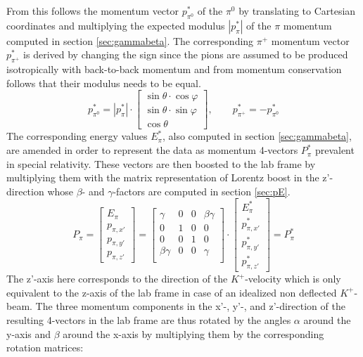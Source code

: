 \documentclass[a4paper,parskip,11pt, DIV12]{scrreprt}
\begin{document}
	From this follows the momentum vector $p^*_{\pi^0}$ of the $\pi^0$ by translating to Cartesian coordinates and multiplying the expected modulus $|p^*_{\pi}|$ of the $\pi$ momentum computed in section \ref{sec:gammabeta}. The corresponding $\pi^+$ momentum vector $p^*_{\pi^+}$ is derived by changing the sign since the pions are assumed to be produced isotropically with back-to-back momentum and from momentum conservation follows that their modulus needs to be equal. 
	\begin{equation}
	p^*_{\pi^0} = |p^*_{\pi}| \cdot \begin{bmatrix}
	\sin\theta \cdot \cos\varphi \\ \sin\theta \cdot \sin\varphi \\ \cos\theta
	\end{bmatrix}
	, \quad \quad p^*_{\pi^+} = -p^*_{\pi^0}
	\end{equation}
	The corresponding energy values $E^*_{\pi}$, also computed in section \ref{sec:gammabeta}, are amended in order to represent the data as momentum 4-vectors $P^*_{\pi}$  prevalent in special relativity. These vectors are then boosted to the lab frame by multiplying them with the matrix representation of Lorentz boost in the z'-direction whose $\beta$- and $\gamma$-factors are computed in section \ref{sec:pE}.
	\begin{equation}
	P_{\pi} = 
	\begin{bmatrix}
	E_{\pi} \\ p_{\pi,x'} \\ p_{\pi,y'} \\ p_{\pi,z'}
	\end{bmatrix}
	=
	\begin{bmatrix}
	\gamma & 0 & 0 & \beta \gamma \\
	0 & 1 & 0 & 0 \\
	0 & 0 & 1 & 0\\
	\beta \gamma & 0 & 0 & \gamma \\
	\end{bmatrix}
	\cdot
	\begin{bmatrix}
	E_{\pi}^* \\ p_{\pi,x'}^* \\ p_{\pi,y'}^* \\ p_{\pi,z'}^*
	\end{bmatrix} = P^*_{\pi}
	\end{equation}
	The z'-axis here corresponds to the direction of the $K^+$-velocity which is only equivalent to the z-axis of the lab frame in case of an idealized non deflected $K^+$-beam. The three momentum components in the x'-, y'-, and z'-direction of the resulting 4-vectors in the lab frame are thus rotated by the angles $\alpha$ around the y-axis and $\beta$ around the x-axis by multiplying them by the corresponding rotation matrices:
\end{document}
